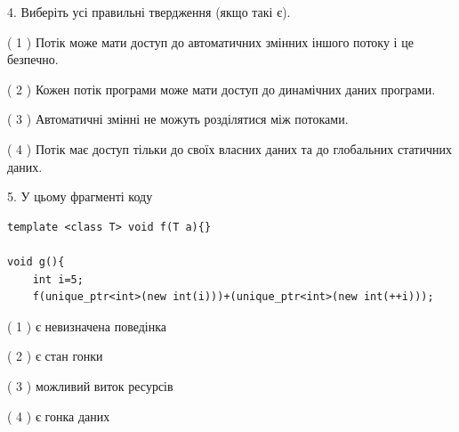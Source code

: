 \documentclass[12pt, ukrainian]{article}
\begin{document}
\begin {large}
{%
4. Виберіть усі правильні твердження (якщо такі є).\par
\vspace{2mm}

( 1 ) Потік може мати доступ до автоматичних змінних іншого потоку і це безпечно.%

( 2 ) Кожен потік програми може мати доступ до динамічних даних програми.%

( 3 ) Автоматичні змінні не можуть розділятися між потоками.%

( 4 ) Потік має доступ тільки до своїх власних даних та до глобальних статичних даних.%


5. У цьому фрагменті коду
\begin{verbatim}
template <class T> void f(T a){}

void g(){
    int i=5;
    f(unique_ptr<int>(new int(i)))+(unique_ptr<int>(new int(++i)));
\end{verbatim}
( 1 ) є невизначена поведінка%

( 2 ) є стан гонки%

( 3 ) можливий виток ресурсів%

( 4 ) є гонка даних%
}
\end {large}
\end{document}

